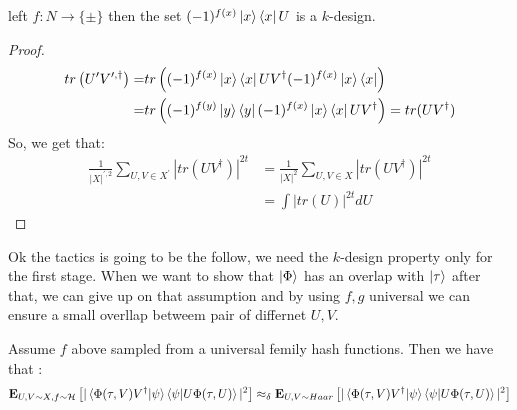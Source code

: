 \documentclass[manuscript,screen,review]{acmart}
\begin{document}
\begin{claim}
  left $f : N \rightarrow \{ \pm \}$ then the set $ (-1)^{f(x)}\ket{x}\bra{x}U$
  is a $k$-design.
\end{claim}
\begin{proof}
  \begin{equation*}
    \begin{split}
      tr\left( U^{\prime}V^{\prime,\dagger} \right)  = & tr\left(
      (-1)^{f(x)}\ket{x}\bra{x}UV^{\dagger} (-1)^{f(x)}\ket{x}\bra{x} \right) \\
      = & tr\left(
      (-1)^{f(y)}\ket{y}\bra{y}(-1)^{f(x)}\ket{x}\bra{x}UV^{\dagger} \right) =
      tr(UV^{\dagger})
    \end{split}
  \end{equation*}
  So, we get that:
  \begin{equation*}
    \begin{split}
      \frac{1}{|X|^{\prime, 2}}\sum_{U,V\in X^{\prime}}{ |tr(UV^{\dagger}
      )|^{2t} } & =  \frac{1}{|X|^{2}}\sum_{U,V\in X}{ |tr(UV^{\dagger} )|^{2t}
      }\\
      & = \int{ |tr(U)|^{2t} dU}
    \end{split}
  \end{equation*}
\end{proof}

Ok the tactics is going to be the follow, we need the $k$-design property only
for the first stage.  When we want to show that $\ket{\Phi}$ has an overlap
with $\ket{\tau}$ after that, we can give up on that assumption and by using
$f,g$ universal we can ensure a small overllap betweem pair of differnet $U,V$.

\begin{claim}
  Assume $f$ above sampled from a universal femily hash functions. Then we have
  that :
  \begin{equation*}
    \begin{split}
      \exppm{ |\braket{\Phi(\tau,V)
      V^{\dagger}|\psi}\braket{\psi|U\Phi(\tau,U)}|^{2} }{U,V \sim X , f\sim
      \mathcal{H}} \approx_{\delta} \exppm{ |\braket{\Phi(\tau,V)
      V^{\dagger}|\psi}\braket{\psi|U\Phi(\tau,U)}|^{2} }{U,V \sim Haar }
    \end{split}
  \end{equation*}
\end{claim}
\end{document}
